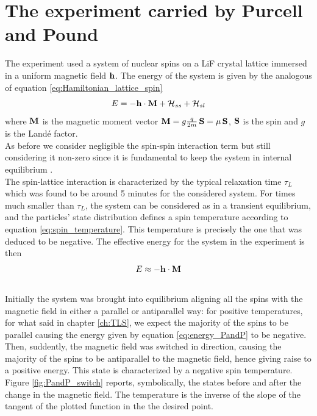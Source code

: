 \section{The experiment carried by Purcell and Pound}
The experiment used a system of nuclear spins on a LiF crystal lattice immersed in a uniform magnetic field $\mathbf{h}$.
The energy of the system is given by the analogous of equation \ref{eq:Hamiltonian_lattice_spin}
\begin{equation*}
    E = - \mathbf{h} \cdot \mathbf{M} + \mathcal{H}_{ss} + \mathcal{H}_{sl}
\end{equation*}
where $\mathbf{M}$ is the magnetic moment vector $\mathbf{M} = g \frac{q}{2m} \, \mathbf{S} = \mu \, \mathbf{S}$, $\mathbf{S}$ is the spin and $g$ is the Landé factor. \\
As before we consider negligible the spin-spin interaction term but still considering it non-zero since it is fundamental to keep the system in internal equilibrium \cite{main_article}. \\
The spin-lattice interaction is characterized by the typical relaxation time $\tau_{L}$ which was found to be around 5 minutes for the considered system. For times much smaller than $\tau_L$, 
the system can be considered as in a transient equilibrium, and the particles' state distribution defines a spin temperature according to equation \ref{eq:spin_temperature}. This temperature is precisely the one
that was deduced to be negative. The effective energy for the system in the experiment is then 
\begin{equation}
    E \approx - \mathbf{h} \cdot \mathbf{M}
    \label{eq:energy_PandP}
\end{equation}\\
Initially the system was brought into equilibrium aligning all the spins with the magnetic field in either a parallel or antiparallel way: for positive temperatures, for what said in chapter \ref{ch:TLS}, we expect the majority of the spins to be parallel causing the energy given by 
equation \ref{eq:energy_PandP} to be negative. \\
Then, suddently, the magnetic field was switched in direction, causing the majority of the spins to be antiparallel to the magnetic field, hence giving raise to a positive energy. This state is characterized by a negative spin temperature.
Figure \ref{fig:PandP_switch} reports, symbolically, the states before and after the change in the magnetic field. The temperature is the inverse of the slope of the tangent of the plotted function in the the desired point. \par
